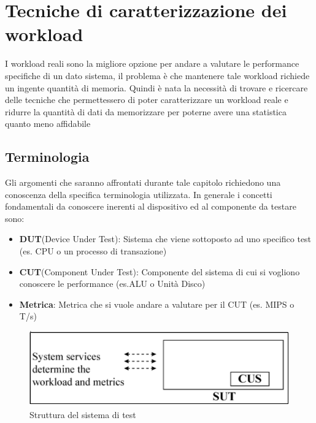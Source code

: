 \chapter{Tecniche di caratterizzazione dei workload}
I workload reali sono la migliore opzione per andare a valutare le performance specifiche di un dato sistema, il problema è che mantenere tale workload richiede un ingente quantità di memoria. Quindi è nata la necessità di trovare e ricercare delle tecniche che permettessero di poter caratterizzare un workload reale e ridurre la quantità di dati da memorizzare per poterne avere una statistica quanto meno affidabile

\section{Terminologia}
Gli argomenti che saranno affrontati durante tale capitolo richiedono una conoscenza della specifica terminologia utilizzata. In generale i concetti fondamentali da conoscere inerenti al dispositivo ed al componente da testare sono:
\begin{itemize}
    \item \textbf{DUT}(Device Under Test): Sistema che viene sottoposto ad uno specifico test (es. CPU o un processo di transazione)
    \item \textbf{CUT}(Component Under Test): Componente del sistema di cui si vogliono conoscere le performance (es.ALU o Unità Disco)
    \item \textbf{Metrica}: Metrica che si vuole andare a valutare per il CUT (es. MIPS o T/s)
\end{itemize}

\begin{figure}[h]
\centering
\includegraphics[width=.8\textwidth]{img/CUS-SUT.png}
\caption{Struttura del sistema di test}\label{img:cus-sut}
\end{figure}

